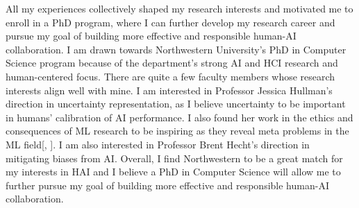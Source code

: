 


All my experiences collectively shaped my research interests and motivated me to enroll in a PhD program, where I can further develop my research career and pursue my goal of building more effective and responsible human-AI collaboration. I am drawn towards Northwestern University's PhD in Computer Science program because of the department's strong AI and HCI research and human-centered focus.
There are quite a few faculty members whose research interests align well with mine. 
I am interested in Professor Jessica Hullman's direction in uncertainty representation, as I believe uncertainty to be important in humans' calibration of AI performance. I also found her work in the ethics and consequences of ML research to be inspiring as they reveal meta problems in the ML field[, ].
I am also interested in Professor Brent Hecht's direction in mitigating biases from AI.
Overall, I find Northwestern to be a great match for my interests in HAI and I believe a PhD in Computer Science will allow me to further pursue my goal of building more effective and responsible human-AI collaboration.